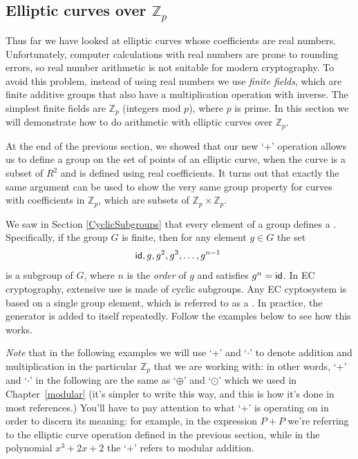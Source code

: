 \subsection{Elliptic curves over $\mathbb{Z}_p$}\label{sec:ECA2} 

Thus far we have looked at elliptic curves whose coefficients are real numbers. Unfortunately, computer calculations with real numbers are prone to rounding errors, so real number arithmetic is not suitable for modern cryptography. To avoid this problem,  instead of using real numbers we use \emph{finite fields}, which are finite additive groups that also have a multiplication operation with inverse. The simplest finite fields are  $\mathbb{Z}_p$ (integers mod $p$),  where $p$ is prime. In this section we will demonstrate how to do arithmetic with elliptic curves over $\mathbb{Z}_p$.

At the end of the previous section, we showed that our new  `+' operation allows us to define a group on the set of points of an elliptic curve, when the curve is a subset of $R^2$ and is defined using real coefficients.  It turns out that exactly the same argument can be used to show the very same group property for curves with coefficients in $\mathbb{Z}_p$, which are subsets of $\mathbb{Z}_p \times \mathbb{Z}_p$.  

We saw in Section \ref{CyclicSubgroups} that every element of a group defines a . Specifically, if the group $G$ is finite, then for any element $g \in G$ the set 
\[ {\sf{i}d}, g, g^2, g^3, \ldots, g^{n-1} \ \]
is a subgroup of $G$, where $n$ is the \emph{order} of $g$ and satisfies $g^n = {\sf{i}d}$. In EC cryptography, extensive use is made of cyclic subgroups.  Any EC cyptosystem is based on a single group element, which is referred to as a .  In practice, the generator is added to itself repeatedly. Follow the examples below to see how this works.

\emph{Note} that in the following examples we will use `+'  and `$\cdot$' to denote addition and multiplication in the particular  $\mathbb{Z}_p$ that we are working with: in other words, `+' and `$\cdot$' in the following are the same as `$\oplus$' and `$\odot$' which we used in Chapter~\ref{modular}  (it's simpler to write this way, and this is how it's done in most references.) You'll have to pay attention to what `+' is operating on in order to discern its meaning:  for example, in the expression $P+P$ we're referring to the elliptic curve operation defined in the previous section, while in the polynomial $x^3 + 2x + 2$  the `+' refers to modular addition. 

